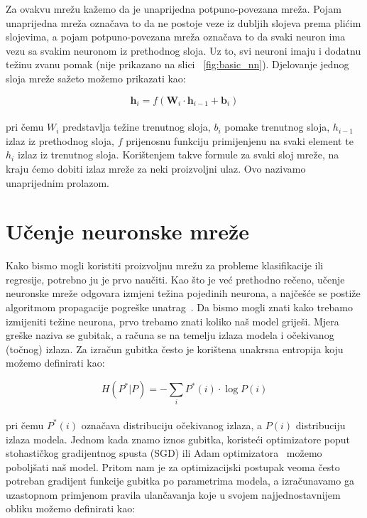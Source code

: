 \documentclass[times, utf8, zavrsni, numeric]{fer}
\begin{document}
Za ovakvu mrežu kažemo da je unaprijedna potpuno-povezana mreža. 
Pojam unaprijedna mreža označava to da ne postoje veze iz dubljih slojeva prema plićim slojevima, a pojam potpuno-povezana mreža označava to da svaki neuron ima vezu sa svakim neuronom iz prethodnog sloja.
Uz to, svi neuroni imaju i dodatnu težinu zvanu pomak (nije prikazano na slici ~\ref{fig:basic_nn}). Djelovanje jednog sloja mreže sažeto možemo prikazati kao:

\begin{equation}
    \pmb{h}_{i} = f(\pmb{W}_{i} \cdot \pmb{h}_{i-1} + \pmb{b}_{i})
    \label{eq:nn_layer}
\end{equation}
\\
pri čemu $W_{i}$ predstavlja težine trenutnog sloja, $b_{i}$ pomake trenutnog sloja, $h_{i-1}$ izlaz iz prethodnog sloja, $f$ prijenosnu funkciju primijenjenu na svaki element te $h_{i}$ izlaz iz trenutnog sloja.
Korištenjem takve formule za svaki sloj mreže, na kraju ćemo dobiti izlaz mreže za neki proizvoljni ulaz. Ovo nazivamo unaprijednim prolazom.

\section{Učenje neuronske mreže}
Kako bismo mogli koristiti proizvoljnu mrežu za probleme klasifikacije ili regresije, potrebno ju je prvo naučiti. 
Kao što je već prethodno rečeno, učenje neuronske mreže odgovara izmjeni težina pojedinih neurona, a najčešće se postiže algoritmom propagacije pogreške unatrag~\cite{Goodfellow-et-al-2016}.
Da bismo mogli znati kako trebamo izmijeniti težine neurona, prvo trebamo znati koliko naš model griješi. Mjera greške naziva se gubitak, a računa se na temelju izlaza modela i očekivanog (točnog) izlaza.
Za izračun gubitka često je korištena unakrsna entropija koju možemo definirati kao:

\begin{equation}
    H(P^{*}|P) = -\sum_{i}P^{*}(i) \cdot \log{P(i)}
    \label{eq:cross_entropy}
\end{equation}
\\
pri čemu $P^{*}(i)$ označava distribuciju očekivanog izlaza, a $P(i)$ distribuciju izlaza modela.
Jednom kada znamo iznos gubitka, koristeći optimizatore poput stohastičkog gradijentnog spusta (SGD) ili Adam optimizatora~\cite{kingma2014adam} možemo poboljšati naš model. 
Pritom nam je za optimizacijski postupak veoma često potreban gradijent funkcije gubitka po parametrima modela, a izračunavamo ga uzastopnom primjenom pravila ulančavanja koje u svojem najjednostavnijem obliku možemo definirati kao:
\end{document}
